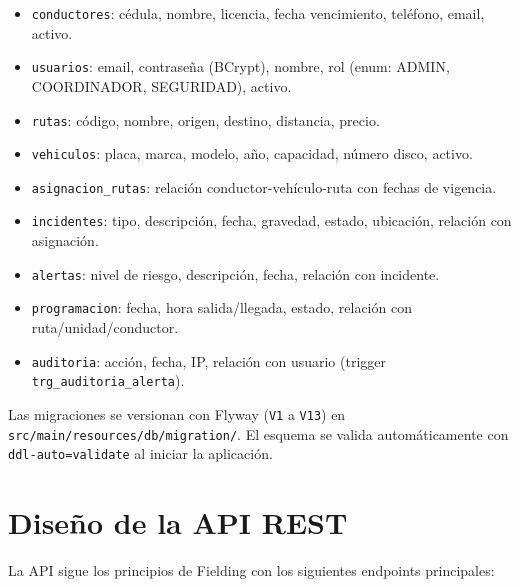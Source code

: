 \begin{itemize}
  \item \texttt{conductores}: cédula, nombre, licencia, fecha vencimiento, teléfono, email, activo.
  \item \texttt{usuarios}: email, contraseña (BCrypt), nombre, rol (enum: ADMIN, COORDINADOR, SEGURIDAD), activo.
  \item \texttt{rutas}: código, nombre, origen, destino, distancia, precio.
  \item \texttt{vehiculos}: placa, marca, modelo, año, capacidad, número disco, activo.
  \item \texttt{asignacion\_rutas}: relación conductor-vehículo-ruta con fechas de vigencia.
  \item \texttt{incidentes}: tipo, descripción, fecha, gravedad, estado, ubicación, relación con asignación.
  \item \texttt{alertas}: nivel de riesgo, descripción, fecha, relación con incidente.
  \item \texttt{programacion}: fecha, hora salida/llegada, estado, relación con ruta/unidad/conductor.
  \item \texttt{auditoria}: acción, fecha, IP, relación con usuario (trigger \texttt{trg\_auditoria\_alerta}).
\end{itemize}

Las migraciones se versionan con Flyway (\texttt{V1} a \texttt{V13}) en \texttt{src/main/resources/db/migration/}. El esquema se valida automáticamente con \texttt{ddl-auto=validate} al iniciar la aplicación.

\section{Diseño de la API REST}
\label{sec:api-rest}

La API sigue los principios de Fielding \cite{fielding2002} con los siguientes endpoints principales:

